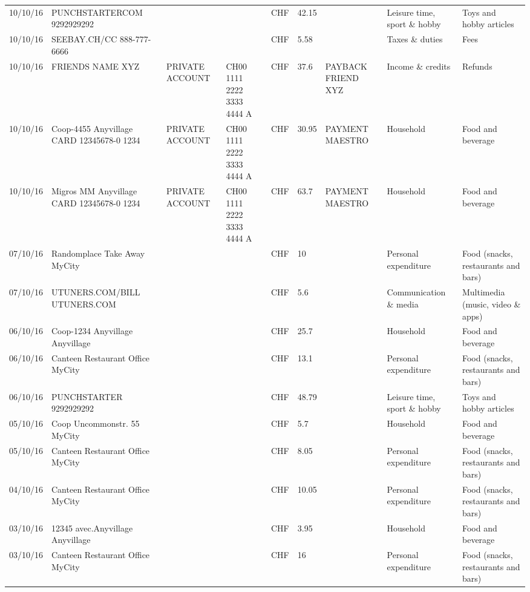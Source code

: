 \begin{landscape}
\begin{center}
\begin{longtable}{lllllllll}
		10/10/16 & PUNCHSTARTERCOM           9292929292 &       &       & CHF   & 42.15 &       & Leisure time, sport \& hobby & Toys and hobby articles \\
		10/10/16 & SEEBAY.CH/CC               888-777-6666 &       &       & CHF   & 5.58  &       & Taxes \& duties & Fees \\
		10/10/16 & FRIENDS NAME XYZ & PRIVATE ACCOUNT & CH00 1111 2222 3333 4444 A & CHF   & 37.6  & PAYBACK FRIEND XYZ & Income \& credits & Refunds \\
		10/10/16 & Coop-4455 Anyvillage CARD 12345678-0 1234 & PRIVATE ACCOUNT & CH00 1111 2222 3333 4444 A & CHF   & 30.95 & PAYMENT MAESTRO & Household & Food and beverage \\
		10/10/16 & Migros MM Anyvillage CARD 12345678-0 1234 & PRIVATE ACCOUNT & CH00 1111 2222 3333 4444 A & CHF   & 63.7  & PAYMENT MAESTRO & Household & Food and beverage \\
		07/10/16 & Randomplace Take Away     MyCity &       &       & CHF   & 10    &       & Personal expenditure & Food (snacks, restaurants and bars) \\
		07/10/16 & UTUNERS.COM/BILL          UTUNERS.COM &       &       & CHF   & 5.6   &       & Communication \& media & Multimedia (music, video \& apps) \\
		06/10/16 & Coop-1234 Anyvillage    Anyvillage &       &       & CHF   & 25.7  &       & Household & Food and beverage \\
		06/10/16 & Canteen Restaurant Office      MyCity &       &       & CHF   & 13.1  &       & Personal expenditure & Food (snacks, restaurants and bars) \\
		06/10/16 & PUNCHSTARTER     9292929292 &       &       & CHF   & 48.79 &       & Leisure time, sport \& hobby & Toys and hobby articles \\
		05/10/16 & Coop Uncommonstr. 55   MyCity &       &       & CHF   & 5.7   &       & Household & Food and beverage \\
		05/10/16 & Canteen Restaurant Office      MyCity &       &       & CHF   & 8.05  &       & Personal expenditure & Food (snacks, restaurants and bars) \\
		04/10/16 & Canteen Restaurant Office      MyCity &       &       & CHF   & 10.05 &       & Personal expenditure & Food (snacks, restaurants and bars) \\
		03/10/16 & 12345 avec.Anyvillage   Anyvillage &       &       & CHF   & 3.95  &       & Household & Food and beverage \\
		03/10/16 & Canteen Restaurant Office      MyCity &       &       & CHF   & 16    &       & Personal expenditure & Food (snacks, restaurants and bars) \\

\end{longtable}
\end{center}
\end{landscape}
